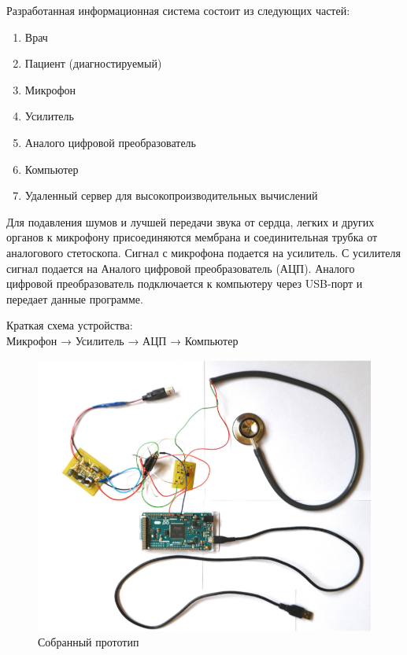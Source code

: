 \documentclass[../paper.tex]{subfiles}
\begin{document}
Разработанная информационная система состоит из следующих частей:
\begin{enumerate}
  \item Врач
  \item Пациент (диагностируемый)
  \item Микрофон
  \item Усилитель
  \item Аналого цифровой преобразователь
  \item Компьютер
  \item Удаленный сервер для высокопроизводительных вычислений
\end{enumerate}

Для подавления шумов и лучшей передачи звука от сердца, легких и других органов к микрофону присоединяются мембрана и соединительная трубка от аналогового стетоскопа. Сигнал с микрофона подается на усилитель. С усилителя сигнал подается на Аналого цифровой преобразователь (АЦП). Аналого цифровой преобразователь подключается к компьютеру через USB-порт и передает данные программе.

\begin{center}
Краткая схема устройства:\\
\noindent\small{{Микрофон → Усилитель → АЦП → Компьютер}}
\end{center}

\begin{figure}[H]
\centering
\includegraphics[width=14cm]{images/hardware.png}
\caption{Собранный прототип}
\end{figure}
\end{document}
